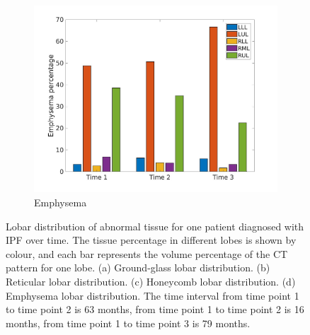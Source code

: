\begin{figure}[H]
\begin{subfigure}{.46\linewidth}
  \includegraphics[width=\linewidth,trim={{.0\wd0} {.0\wd0} {.0\wd0} {.0\wd0}},clip]{QuantitativeAnalysis/Image/IPF21EmphysemaLobarRegionDiseaseDistributionOverTime.jpg}
  \caption{Emphysema}
  \label{fig:IPF21LobarRegionDiseaseDistributionOverTimeMain-d}
\end{subfigure}
\caption{Lobar distribution of abnormal tissue for one patient diagnosed with IPF over time. The tissue percentage in different lobes is shown by colour, and each bar represents the volume percentage of the CT pattern for one lobe. (a) Ground-glass lobar distribution. (b) Reticular lobar distribution. (c) Honeycomb lobar distribution. (d) Emphysema lobar distribution. The time interval from time point 1 to time point 2 is 63 months, from time point 1 to time point 2 is 16 months, from time point 1 to time point 3 is 79 months.}
\label{fig:IPF21LobarRegionDiseaseDistributionOverTimeMain}
\end{figure}

